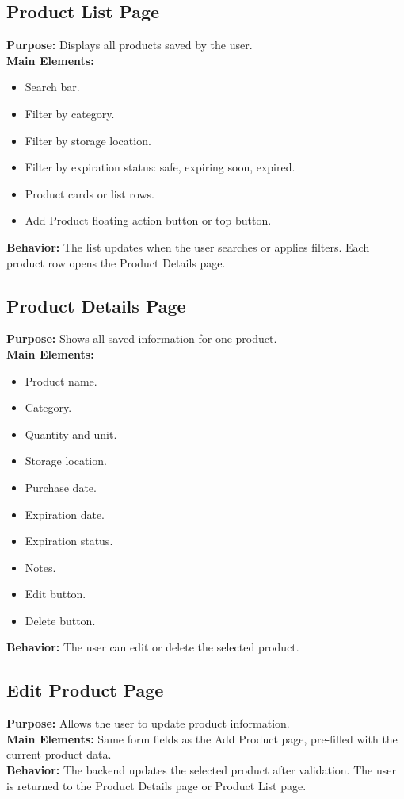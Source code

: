 \documentclass[12pt]{article}
\begin{document}
\subsection{Product List Page}
\textbf{Purpose:} Displays all products saved by the user.\\
\textbf{Main Elements:}
\begin{itemize}[leftmargin=*]
    \item Search bar.
    \item Filter by category.
    \item Filter by storage location.
    \item Filter by expiration status: safe, expiring soon, expired.
    \item Product cards or list rows.
    \item Add Product floating action button or top button.
\end{itemize}
\textbf{Behavior:} The list updates when the user searches or applies filters. Each product row opens the Product Details page.

\subsection{Product Details Page}
\textbf{Purpose:} Shows all saved information for one product.\\
\textbf{Main Elements:}
\begin{itemize}[leftmargin=*]
    \item Product name.
    \item Category.
    \item Quantity and unit.
    \item Storage location.
    \item Purchase date.
    \item Expiration date.
    \item Expiration status.
    \item Notes.
    \item Edit button.
    \item Delete button.
\end{itemize}
\textbf{Behavior:} The user can edit or delete the selected product.

\subsection{Edit Product Page}
\textbf{Purpose:} Allows the user to update product information.\\
\textbf{Main Elements:} Same form fields as the Add Product page, pre-filled with the current product data.\\
\textbf{Behavior:} The backend updates the selected product after validation. The user is returned to the Product Details page or Product List page.
\end{document}
